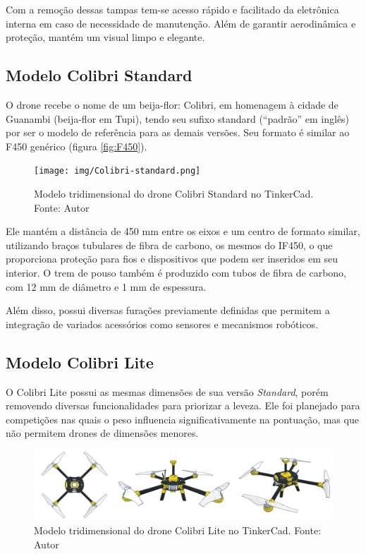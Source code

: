 \documentclass[conference]{IEEEtran}
\begin{document}
Com a remoção dessas tampas tem-se acesso rápido e facilitado da eletrônica interna em caso de necessidade de manutenção. Além de garantir aerodinâmica e proteção, mantém um visual limpo e elegante.

\subsection{Modelo Colibri Standard}

O drone recebe o nome de um beija-flor: Colibri, em homenagem à cidade de Guanambi (beija-flor em Tupi), tendo seu sufixo standard (“padrão” em inglês) por ser o modelo de referência para as demais versões. Seu formato é similar ao F450 genérico (figura \ref{fig:F450}).

\begin{figure}[!htb]
    \centering
    \texttt{[image: img/Colibri-standard.png]} 
    \caption{Modelo tridimensional do drone Colibri Standard no TinkerCad. Fonte: Autor}
    \label{fig:ColibriStandard}
\end{figure}

Ele mantém a distância de 450 mm entre os eixos e um centro de formato similar, utilizando braços tubulares de fibra de carbono, os mesmos do IF450, o que proporciona proteção para fios e dispositivos que podem ser inseridos em seu interior. O trem de pouso também é produzido com tubos de fibra de carbono, com 12 mm de diâmetro e 1 mm de espessura. 

Além disso, possui diversas furações previamente definidas que permitem a integração de variados acessórios como sensores e mecanismos robóticos.

\subsection{Modelo Colibri Lite}

O Colibri Lite possui as mesmas dimensões de sua versão \textit{Standard}, porém removendo diversas funcionalidades para priorizar a leveza. Ele foi planejado para competições nas quais o peso influencia significativamente na pontuação, mas que não permitem drones de dimensões menores.

\begin{figure}[!htb]
    \centering
    \includegraphics[scale=0.14]{img/Colibri-lite.png} 
    \caption{Modelo tridimensional do drone Colibri Lite no TinkerCad. Fonte: Autor}
    \label{fig:my_label}
\end{figure}
\end{document}
